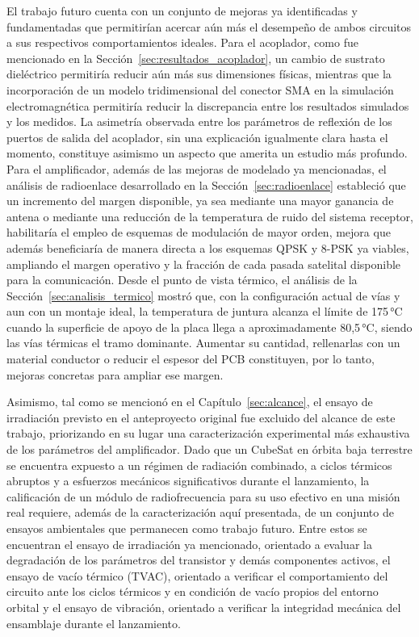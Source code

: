 El trabajo futuro cuenta con un conjunto de mejoras ya identificadas y fundamentadas que permitirían acercar aún más el desempeño de ambos circuitos a sus respectivos comportamientos ideales. Para el acoplador, como fue mencionado en la Sección~\ref{sec:resultados_acoplador}, un cambio de sustrato dieléctrico permitiría reducir aún más sus dimensiones físicas, mientras que la incorporación de un modelo tridimensional del conector SMA en la simulación electromagnética permitiría reducir la discrepancia entre los resultados simulados y los medidos. La asimetría observada entre los parámetros de reflexión de los puertos de salida del acoplador, sin una explicación igualmente clara hasta el momento, constituye asimismo un aspecto que amerita un estudio más profundo. Para el amplificador, además de las mejoras de modelado ya mencionadas, el análisis de radioenlace desarrollado en la Sección~\ref{sec:radioenlace} estableció que un incremento del margen disponible, ya sea mediante una mayor ganancia de antena o mediante una reducción de la temperatura de ruido del sistema receptor, habilitaría el empleo de esquemas de modulación de mayor orden, mejora que además beneficiaría de manera directa a los esquemas QPSK y 8-PSK ya viables, ampliando el margen operativo y la fracción de cada pasada satelital disponible para la comunicación. Desde el punto de vista térmico, el análisis de la Sección~\ref{sec:analisis_termico} mostró que, con la configuración actual de vías y aun con un montaje ideal, la temperatura de juntura alcanza el límite de 175\,°C cuando la superficie de apoyo de la placa llega a aproximadamente 80,5\,°C, siendo las vías térmicas el tramo dominante. Aumentar su cantidad, rellenarlas con un material conductor o reducir el espesor del PCB constituyen, por lo tanto, mejoras concretas para ampliar ese margen.

Asimismo, tal como se mencionó en el Capítulo~\ref{sec:alcance}, el ensayo de irradiación previsto en el anteproyecto original fue excluido del alcance de este trabajo, priorizando en su lugar una caracterización experimental más exhaustiva de los parámetros del amplificador. Dado que un CubeSat en órbita baja terrestre se encuentra expuesto a un régimen de radiación combinado, a ciclos térmicos abruptos y a esfuerzos mecánicos significativos durante el lanzamiento, la calificación de un módulo de radiofrecuencia para su uso efectivo en una misión real requiere, además de la caracterización aquí presentada, de un conjunto de ensayos ambientales que permanecen como trabajo futuro. Entre estos se encuentran el ensayo de irradiación ya mencionado, orientado a evaluar la degradación de los parámetros del transistor y demás componentes activos, el ensayo de vacío térmico (TVAC), orientado a verificar el comportamiento del circuito ante los ciclos térmicos y en condición de vacío propios del entorno orbital y el ensayo de vibración, orientado a verificar la integridad mecánica del ensamblaje durante el lanzamiento.

